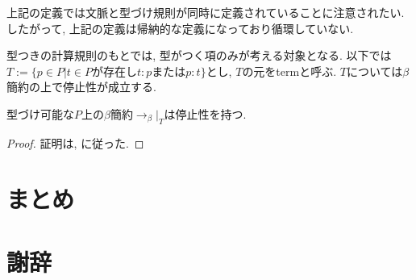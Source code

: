 \documentclass{ltjsarticle}
\begin{document}
\begin{rem}
 上記の定義では文脈と型づけ規則が同時に定義されていることに注意されたい. したがって, 上記の定義は帰納的な定義になっており循環していない.
\end{rem}

型つきの計算規則のもとでは, 型がつく項のみが考える対象となる. 以下では$T := \{p \in P | t \in P\text {が存在し} t : p \text{または} p : t \}$とし, $T$の元をtermと呼ぶ. $T$については$\beta$簡約の上で停止性が成立する.

\begin{thm}
 型づけ可能な$P$上の$\beta$簡約$\rightarrow_{\beta}|_T$は停止性を持つ.
\end{thm}
\begin{proof}
 証明は\cite{geuvers1994short}, \cite{girard1989proofs}に従った.
\end{proof}


\section{まとめ}

\section{謝辞}



\end{document}
